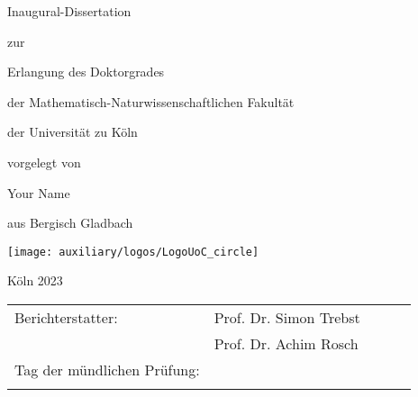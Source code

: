 \begin{titlepage}
\renewcommand{\footnotesize}{\small}
\renewcommand{\footnoterule}{\relax}

\thispagestyle{empty}
\renewcommand{\baselinestretch}{1} 
\begin{center}
	{\vspace*{1mm} \Huge {\color{maincolor2} } \par}
	{ \Large \vspace*{20mm} {\LARGE \mainsemibold Inaugural-Dissertation} \par \vspace*{4mm} zur \par \vspace*{4mm} Erlangung des Doktorgrades \par \vspace*{4mm} der Mathematisch-Naturwissenschaftlichen Fakultät \par \vspace*{4mm} der Universität zu Köln \par \vspace*{4mm} vorgelegt von \par  \vspace*{15mm}}
	{{\LARGE \mainsemibold Your Name} \par \vspace*{10mm}}
	{\large \vspace*{1ex} aus Bergisch Gladbach \par \vspace*{1ex}}
	{\vspace*{10mm} {\texttt{[image: auxiliary/logos/LogoUoC\_circle]}} \vspace*{10mm} \par} %
	{\large K\"oln 2023}
\end{center}
\end{titlepage}


\thispagestyle{empty}
\begin{center}
\setlength{\tabcolsep}{2em} %
\begin{tabular}{lllll}
	Berichterstatter:           & Prof. Dr. Simon Trebst &  &  &  \\[1em]
	& Prof. Dr. Achim Rosch  &  &  &  \\[2em]
	Tag der mündlichen Prüfung: &             &  &  &  \\
	&                        &  &  & 
\end{tabular}
\end{center}
